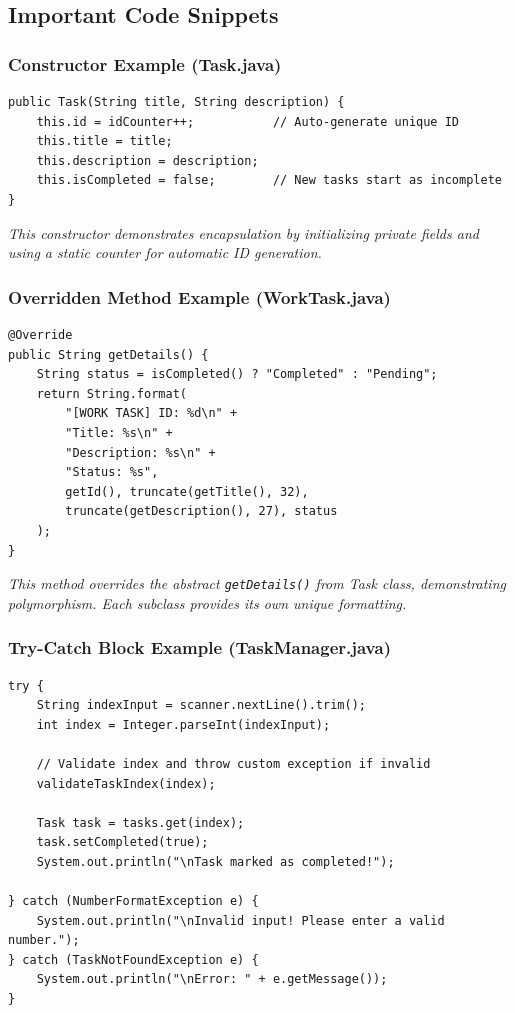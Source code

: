\documentclass[12pt,a4paper]{article}
\begin{document}
\subsection{Important Code Snippets}

\subsubsection{Constructor Example (Task.java)}

\begin{lstlisting}[caption={Task Constructor}]
public Task(String title, String description) {
    this.id = idCounter++;           // Auto-generate unique ID
    this.title = title;
    this.description = description;
    this.isCompleted = false;        // New tasks start as incomplete
}
\end{lstlisting}

\textit{This constructor demonstrates encapsulation by initializing private fields and using a static counter for automatic ID generation.}

\subsubsection{Overridden Method Example (WorkTask.java)}

\begin{lstlisting}[caption={WorkTask getDetails() Method}]
@Override
public String getDetails() {
    String status = isCompleted() ? "Completed" : "Pending";
    return String.format(
        "[WORK TASK] ID: %d\n" +
        "Title: %s\n" +
        "Description: %s\n" +
        "Status: %s",
        getId(), truncate(getTitle(), 32),
        truncate(getDescription(), 27), status
    );
}
\end{lstlisting}

\textit{This method overrides the abstract \texttt{getDetails()} from Task class, demonstrating polymorphism. Each subclass provides its own unique formatting.}
\newpage
\subsubsection{Try-Catch Block Example (TaskManager.java)}

\begin{lstlisting}[caption={Exception Handling Example}]
try {
    String indexInput = scanner.nextLine().trim();
    int index = Integer.parseInt(indexInput);
    
    // Validate index and throw custom exception if invalid
    validateTaskIndex(index);
    
    Task task = tasks.get(index);
    task.setCompleted(true);
    System.out.println("\nTask marked as completed!");
    
} catch (NumberFormatException e) {
    System.out.println("\nInvalid input! Please enter a valid number.");
} catch (TaskNotFoundException e) {
    System.out.println("\nError: " + e.getMessage());
}
\end{lstlisting}
\end{document}
